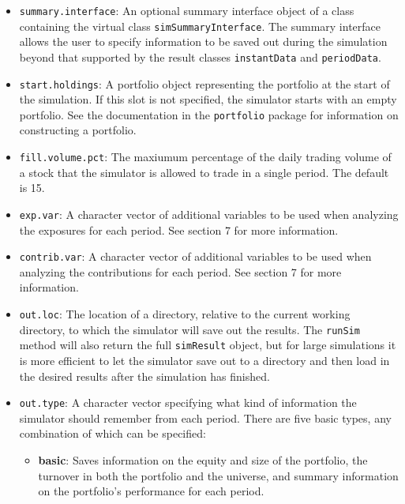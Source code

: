 \documentclass{article}
\begin{document}
\begin{itemize}
\item{\texttt{summary.interface}}: An optional summary interface
object of a class containing the virtual class
\texttt{simSummaryInterface}.  The summary interface allows the user
to specify information to be saved out during the simulation beyond
that supported by the result classes \texttt{instantData} and
\texttt{periodData}.

\item{\texttt{start.holdings}}: A portfolio object representing the
portfolio at the start of the simulation.  If this slot is not
specified, the simulator starts with an empty portfolio.  See the
documentation in the \texttt{portfolio} package for information on
constructing a portfolio.

\item{\texttt{fill.volume.pct}}: The maxiumum percentage of the daily
trading volume of a stock that the simulator is allowed to trade in
a single period.  The default is 15.

\item{\texttt{exp.var}}: A character vector of additional variables to
be used when analyzing the exposures for each period.  See section 7
for more information.

\item{\texttt{contrib.var}}: A character vector of additional
variables to be used when analyzing the contributions for each period.
See section 7 for more information.

\item{\texttt{out.loc}}: The location of a directory, relative to the
current working directory, to which the simulator will save out the
results.  The \texttt{runSim} method will also return the full
\texttt{simResult} object, but for large simulations it is more
efficient to let the simulator save out to a directory and then load
in the desired results after the simulation has finished.

\item{\texttt{out.type}}: A character vector specifying what kind of
information the simulator should remember from each period.  There are
five basic types, any combination of which can be specified:

\begin{itemize}

\item{\bf{basic}}: Saves information on the equity and size of the
portfolio, the turnover in both the portfolio and the universe, and
summary information on the portfolio's performance for each period.


\end{itemize}
\end{itemize}
\end{document}
